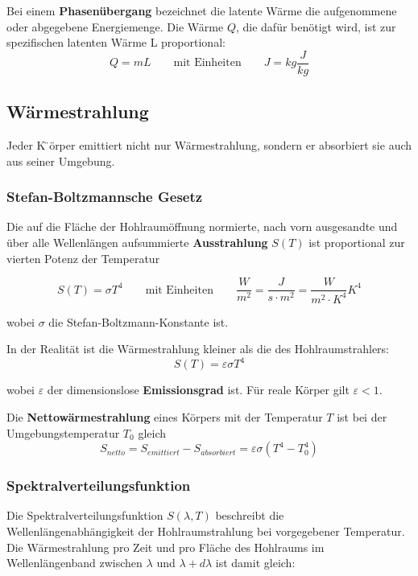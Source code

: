 \documentclass[11pt]{article}
\begin{document}
Bei einem \textbf{Phasen{\"u}bergang} bezeichnet die latente W{\"a}rme die aufgenommene oder abgegebene Energiemenge. Die W{\"a}rme $Q$, die daf{\"u}r ben{\"o}tigt wird, ist zur spezifischen latenten W{\"a}rme L proportional:
\begin{equation*}
	Q = mL \qquad\text{mit Einheiten}\qquad J = kg\frac{J}{kg}
\end{equation*}

\subsection{W{\"a}rmestrahlung}

Jeder K ̈{\"o}rper emittiert nicht nur W{\"a}rmestrahlung, sondern er absorbiert sie auch aus seiner Umgebung. \newline

\subsubsection{Stefan-Boltzmannsche Gesetz}
Die auf die Fl{\"a}che der Hohlraum{\"o}ffnung normierte, nach vorn ausgesandte und {\"u}ber alle Wellenl{\"a}ngen aufsummierte  \textbf{Ausstrahlung} $S(T)$ ist proportional zur vierten Potenz der Temperatur

\begin{equation*}
	S(T) = \sigma T^4 \qquad\text{mit Einheiten}\qquad \frac{W}{m^2} = \frac{J}{s \cdot m^2} = \frac{W}{m^2 \cdot K^4}K^4
\end{equation*}

wobei $\sigma$ die Stefan-Boltzmann-Konstante ist. \newline

In der Realit{\"a}t ist die W{\"a}rmestrahlung kleiner als die des Hohlraumstrahlers:
\begin{equation*}
	S(T) = \varepsilon \sigma T^4
\end{equation*}

wobei $\varepsilon$ der dimensionslose \textbf{Emissionsgrad} ist. F{\"u}r reale K{\"o}rper gilt $\varepsilon < 1$. \newline

Die \textbf{Nettow{\"a}rmestrahlung} eines K{\"o}rpers mit der Temperatur $T$ ist bei der Umgebungstemperatur $T_0$ gleich
\begin{equation*}
	S_{netto} = S_{emittiert} - S_{absorbiert} = \varepsilon\sigma(T^4 - T^4_0)
\end{equation*}

\subsubsection{Spektralverteilungsfunktion}
Die Spektralverteilungsfunktion $S(\lambda, T)$ beschreibt die Wellenl{\"a}ngenabh{\"a}ngigkeit der Hohlraumstrahlung bei vorgegebener Temperatur. Die W{\"a}rmestrahlung pro Zeit und pro Fl{\"a}che des Hohlraums im Wellenl{\"a}ngenband zwischen $\lambda$ und $\lambda + d\lambda$ ist damit gleich:
\end{document}
